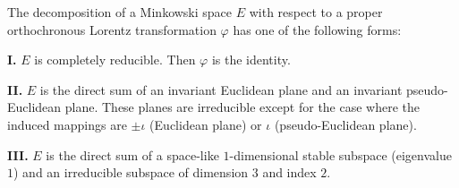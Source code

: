 The decomposition of a Minkowski space $E$ with respect to a proper orthochronous Lorentz transformation $\varphi$ has one of the following forms:

\textbf{I.} $E$ is completely reducible. Then $\varphi$ is the identity.

\textbf{II.} $E$ is the direct sum of an invariant Euclidean plane and an invariant pseudo-Euclidean plane. These planes are irreducible except for the case where the induced mappings are $\pm \iota$ (Euclidean plane) or $\iota$ (pseudo-Euclidean plane).

\textbf{III.} $E$ is the direct sum of a space-like $1$-dimensional stable subspace (eigenvalue $1$) and an irreducible subspace of dimension $3$ and index $2$.
